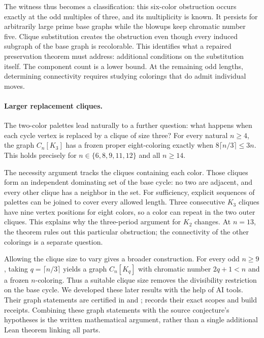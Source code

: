The witness thus becomes a classification: this six-color obstruction
occurs exactly at the odd multiples of three, and its multiplicity is known.
It persists for arbitrarily large prime base graphs while the blowups
keep chromatic number five. Clique substitution creates the obstruction
even though every induced subgraph of the base graph is recolorable.
This identifies what a repaired preservation theorem must address:
additional conditions on the substitution itself. The component count
is a lower bound. At the remaining odd lengths, determining connectivity
requires studying colorings that do admit individual moves.


\paragraph{Larger replacement cliques.}
The two-color palettes lead naturally to a further question: what
happens when each cycle vertex is replaced by a clique of size three?
For every natural $n\ge4$, the graph $C_n[K_3]$ has a frozen proper
eight-coloring exactly when
$8\lceil n/3\rceil\le3n$. This holds precisely for
$n\in\{6,8,9,11,12\}$ and all $n\ge14$.

The necessity argument tracks the cliques containing each color.
Those cliques form an independent dominating set of the base cycle:
no two are adjacent, and every other clique has a neighbor in the set.
For sufficiency, explicit sequences of palettes can be joined to cover
every allowed length. Three consecutive $K_3$ cliques have nine vertex
positions for eight colors, so a color can repeat in the two outer
cliques. This explains why the three-period argument for $K_2$ changes.
At $n=13$, the theorem rules out this particular obstruction; the
connectivity of the other colorings is a separate question.

Allowing the clique size to vary gives a broader construction. For
every odd $n\ge9$, taking $q=\lceil n/3\rceil$ yields a graph
$C_n[K_q]$ with chromatic number $2q+1<n$ and a frozen $n$-coloring.
Thus a suitable clique size removes the divisibility restriction on
the base cycle. We developed these later results with the help of AI
tools. Their graph statements are certified in
 and
;
 records their exact scopes and build
receipts. Combining these graph statements with the source conjecture's
hypotheses is the written mathematical argument, rather than a single
additional Lean theorem linking all parts.

